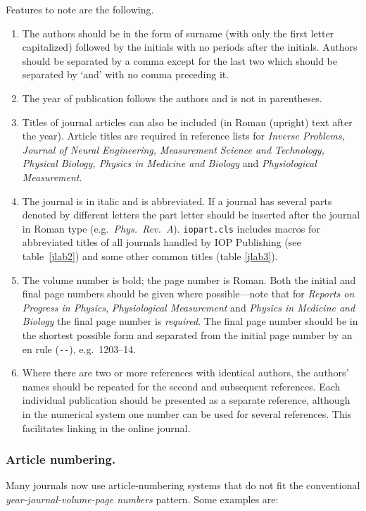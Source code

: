 \documentclass[12pt]{iopart}
\begin{document}
\noindent Features to note are the following.

\begin{enumerate}
\item The authors should be in the form of surname (with only the first 
letter capitalized) followed by the initials with no 
periods after the initials. Authors should be separated by a comma 
except for the last two which should be separated by `and' with no 
comma preceding it.

\item The year of publication follows the authors and is not in parentheses.  

\item Titles of journal articles can also be included (in Roman (upright) text after the year). Article titles are required in reference lists for {\it Inverse Problems, Journal of Neural Engineering, Measurement Science and Technology, Physical Biology, Physics in Medicine and Biology\/} and {\it Physiological Measurement}.

\item The journal is in italic and is abbreviated. If a journal has several parts denoted by 
different letters the part letter should be inserted after the journal in Roman type (e.g.\ 
{\it Phys.\ Rev.\ \rm A}). \verb"iopart.cls" includes macros for abbreviated titles of all journals handled by IOP Publishing (see table~\ref{jlab2}) and some other common titles (table \ref{jlab3}). 

\item The volume number is bold; the page number is Roman.
 Both the initial and final page numbers should be given where possible---note that for {\it Reports on Progress in Physics\/}, {\it Physiological Measurement} and {\it Physics in Medicine and Biology}
 the final page number is {\it required}. The final page number should be in 
the shortest possible form and separated from the initial page number by an en rule (\verb"--"), e.g.\ 1203--14.

\item Where there are two or more references with identical authors, 
the authors' names should be repeated for the second and subsequent references. Each individual publication should be presented as a separate reference, although in the numerical system one number can be used for several references. This facilitates linking in the online journal. 
\end{enumerate}


\subsubsection{Article numbering.}
Many journals now use article-numbering systems that do not fit the conventional {\it year-journal-volume-page numbers} pattern. Some examples are:
\end{document}
